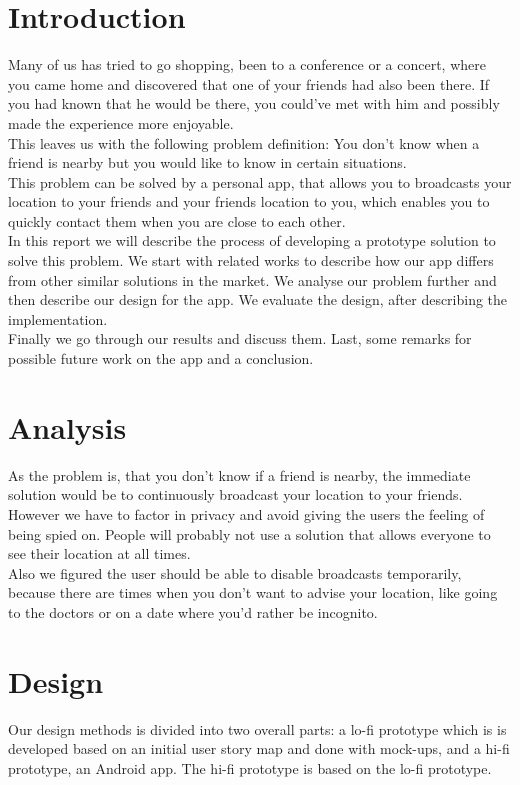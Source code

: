 \documentclass[runningheads,a4paper]{llncs}
\begin{document}
\section{Introduction}
Many of us has tried to go shopping, been to a conference or a concert, where you came home and discovered that one of your friends had also been there. If you had known that he would be there, you could’ve met with him and possibly made the experience more enjoyable.\\

This leaves us with the following problem definition: You don’t know when a friend is nearby but you would like to know in certain situations. \\

This problem can be solved by a personal app, that allows you to  broadcasts your location to your friends and your friends location to you, which enables you to quickly contact them when you are close to each other.\\

In this report we will describe the process of developing a prototype solution to solve this problem.
We start with related works to describe how our app differs from other similar solutions in the market. 
We analyse our problem further and then describe our design for the app. We evaluate the design, after describing the implementation. \\
Finally we go through our results and discuss them. Last, some remarks for possible future work on the app and a conclusion. 

\section{Analysis}
As the problem is, that you don’t know if a friend is nearby, the immediate solution would be to continuously broadcast your location to your friends.
However we have to factor in privacy and avoid giving the users the feeling of being spied on. People will probably not use a solution that allows everyone to see their location at all times.\\
Also we figured the user should be able to disable broadcasts temporarily, because there are times when you don't want to advise your location, like going to the doctors or on a date where you’d rather be incognito. 

\section{Design}
Our design methods is divided into two overall parts: a lo-fi prototype which is is developed based on an initial user story map and done with mock-ups, and a hi-fi prototype, an Android app. The hi-fi prototype is based on the lo-fi prototype. 
\end{document}
